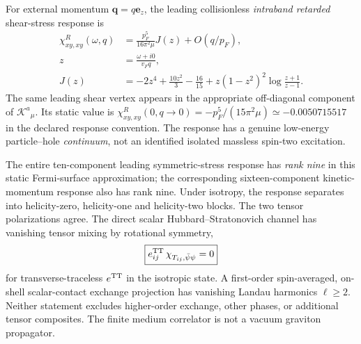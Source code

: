 \documentclass[11pt,a4paper]{article}
\begin{document}
For external momentum $\bm q=q\bm e_z$, the leading collisionless
\emph{intraband retarded} shear-stress response is
\begin{equation}\label{eq:qgd075-shear}
 \boxed{\begin{aligned}
 \chi^R_{xy,xy}(\omega,q)&=\frac{p_F^5}{16\pi^2\mu}J(z)+O(q/p_F),\\
 z&=\frac{\omega+i0}{v_Fq},\\
 J(z)&=-2z^4+\frac{10z^2}{3}-\frac{16}{15}
 +z(1-z^2)^2\log\frac{z+1}{z-1}.
 \end{aligned}}
\end{equation}
The same leading shear vertex appears in the appropriate off-diagonal
component of $\mathcal K^a{}_{\mu}$.  Its static value is
$\chi^R_{xy,xy}(0,q\to0)=-p_F^5/(15\pi^2\mu)
\simeq-0.0050715517$ in the declared response convention.
The response has a genuine low-energy particle--hole \emph{continuum},
not an identified isolated massless spin-two excitation.

The entire ten-component leading symmetric-stress response has
\emph{rank nine} in this static Fermi-surface approximation; the
corresponding sixteen-component kinetic-momentum response also has rank
nine. Under isotropy, the response separates into helicity-zero,
helicity-one and helicity-two blocks. The two tensor polarizations agree.
The direct scalar Hubbard--Stratonovich channel has vanishing tensor
mixing by rotational symmetry,
\begin{equation}\label{eq:qgd075-scalar-TT}
 \boxed{e_{ij}^{\rm TT}\,\chi_{T_{ij},\bar\psi\psi}=0}
\end{equation}
for transverse-traceless $e^{\rm TT}$ in the isotropic state.  A first-order
spin-averaged, on-shell scalar-contact exchange projection has vanishing
Landau harmonics $\ell\ge2$. Neither statement excludes higher-order
exchange, other phases, or additional tensor composites.  The finite
medium correlator is not a vacuum graviton propagator.
\end{document}
